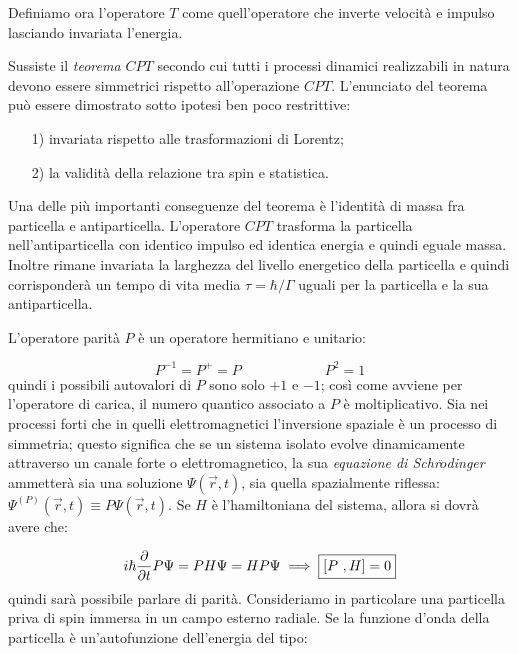 Definiamo ora l'operatore $T$ come quell'operatore che inverte velocità e
impulso lasciando invariata l'energia.

Sussiste il \textit{teorema $CPT$} secondo cui tutti i processi dinamici
realizzabili in natura devono essere simmetrici rispetto all'operazione $CPT$.
L'enunciato del teorema può essere dimostrato sotto ipotesi ben poco
restrittive:

\begin{itemize}
\item[1)] invariata rispetto alle trasformazioni di Lorentz;
\item[2)] la validità della relazione tra spin e statistica. 
\end{itemize}

Una delle più importanti conseguenze del teorema è l'identità di massa fra
particella e antiparticella. L'operatore $CPT$ trasforma la particella
nell'antiparticella con identico impulso ed identica energia e quindi eguale
massa. Inoltre rimane invariata la larghezza del livello energetico della
particella e quindi corrisponderà un tempo di vita media $\tau = \hbar / \Gamma$
uguali per la particella e la sua antiparticella.

L'operatore parità $P$ è un operatore hermitiano e unitario:

\begin{equation*}
P^{-1} = P^+ = P \qquad \qquad \qquad P^2 = 1
\end{equation*}
quindi i possibili autovalori di $P$ sono solo $+1$ e $-1$; così come avviene
per l'operatore di carica, il numero quantico associato a $P$ è moltiplicativo.
Sia nei processi forti che in quelli elettromagnetici l'inversione spaziale è un
processo di simmetria; questo significa che se un sistema isolato	evolve
dinamicamente attraverso un canale forte o elettromagnetico, la sua
\textit{equazione di Schr$\ddot{o}$dinger} ammetterà sia una soluzione
$\Psi(\vec{r},t)$, sia quella spazialmente riflessa: $\Psi^{(P)} (\vec{r} , t)
\equiv P \Psi (\vec{r}, t)$. Se $H$ è l'hamiltoniana del sistema, allora si
dovrà avere che:

\begin{equation*}
i \hbar \dfrac{\partial}{\partial t} P \Psi = P H \Psi = H P \Psi \implies \fbox{$[P \ , H]=0$}
\end{equation*}
quindi sarà possibile parlare di parità. Consideriamo in particolare una
particella priva di spin immersa in un campo esterno radiale. Se la funzione
d'onda della particella è un'autofunzione dell'energia del tipo:

